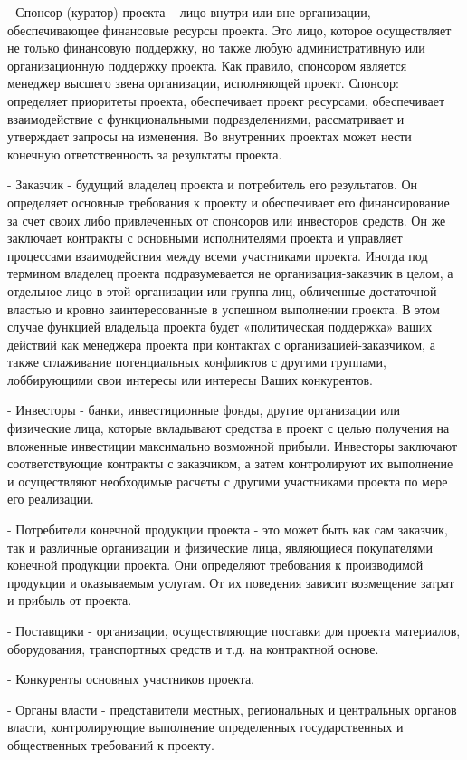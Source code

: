 \documentclass{../industrial-development}
\begin{document}
- Спонсор (куратор) проекта – лицо внутри или вне организации, обеспечивающее финансовые ресурсы проекта. Это лицо, которое осуществляет не только финансовую поддержку, но также любую административную или организационную поддержку проекта. Как правило, спонсором является менеджер высшего звена организации, исполняющей проект. Спонсор: определяет приоритеты проекта, обеспечивает проект ресурсами, обеспечивает взаимодействие с функциональными подразделениями, рассматривает и утверждает запросы на изменения. Во внутренних проектах может нести конечную ответственность за результаты проекта.

- Заказчик - будущий владелец проекта и потребитель его результатов. Он определяет основные требования к проекту и обеспечивает его финансирование за счет своих либо привлеченных от спонсоров или инвесторов средств. Он же заключает контракты с основными исполнителями проекта и управляет процессами взаимодействия между всеми участниками проекта. Иногда под термином владелец проекта подразумевается не организация-заказчик в целом, а отдельное лицо в этой организации или группа лиц, обличенные достаточной властью и кровно заинтересованные в успешном выполнении проекта. В этом случае функцией владельца проекта будет «политическая поддержка» ваших действий как менеджера проекта при контактах с организацией-заказчиком, а также сглаживание потенциальных конфликтов с другими группами, лоббирующими свои интересы или интересы Ваших конкурентов.

- Инвесторы - банки, инвестиционные фонды, другие организации или физические лица, которые вкладывают средства в проект с целью получения на вложенные инвестиции максимально возможной прибыли. Инвесторы заключают соответствующие контракты с заказчиком, а затем контролируют их выполнение и осуществляют необходимые расчеты с другими участниками проекта по мере его реализации.

- Потребители конечной продукции проекта - это может быть как сам заказчик, так и различные организации и физические лица, являющиеся покупателями конечной продукции проекта. Они определяют требования к производимой продукции и оказываемым услугам. От их поведения зависит возмещение затрат и прибыль от проекта.

- Поставщики - организации, осуществляющие поставки для проекта материалов, оборудования, транспортных средств и т.д. на контрактной основе.

- Конкуренты основных участников проекта.

- Органы власти - представители местных, региональных и центральных органов власти, контролирующие выполнение определенных государственных и общественных требований к проекту.
\end{document}
